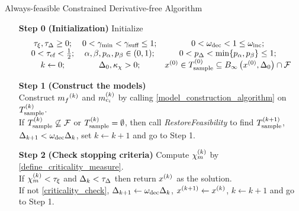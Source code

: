 {
\begin{fullwidth}[leftmargin=0in, rightmargin=0in, width=\linewidth-0.25in]
\begin{flushleft}


\begin{algorithm}[H]
    \caption{Always-feasible Constrained Derivative-free Algorithm}
    \label{constrained_dfo}
    \begin{itemize}
        \item[\textbf{Step 0}] \textbf{(Initialization)} Initialize
\begin{align*}
\begin{array}{ccc}
\tau_{\xi}, \tau_{\Delta} \ge 0; & 
0 < \gamma_{\textrm{min}} < \gamma_{\textrm{suff}} \le 1; & 
0 < \omega_{\text{dec}} < 1 \le \omega_{\text{inc}}; \\
0 < {\tau_{\textrm{ef}}} < \frac 1 2;  & 
\alpha, \beta, p_{\alpha}, p_{\beta} \in (0, 1); & 
0 < p_{\Delta} < \min\{p_{\alpha}, p_{\beta}\} \le 1;  \\
k \gets 0; &
\Delta_0, \kappa_{\chi} > 0; &
{x^{(0)}} \in T^{(0)}_{\textrm{sample}} \subseteq B_{\infty}\left({x^{(0)}}, \Delta_{0}\right) \cap {\mathcal F}
\end{array}
\end{align*}
        \item[\textbf{Step 1}] \textbf{(Construct the models)} \\
        Construct ${{m}_f}^{(k)}$ and ${{m}^{(k)}_{c_i}}$ by calling \cref{model_construction_algorithm} on ${T_{\text{sample}}^{(k)}}$. \\
        If ${T_{\text{sample}}^{(k)}} \not \subseteq {\mathcal F}$ or ${T_{\text{sample}}^{(k)}} = \emptyset$, then call \emph{RestoreFeasibility}  to find ${T_{\text{sample}}^{(k+1)}}$, $\Delta_{k+1}<\omega_{\text{dec}} \Delta_k$, set $k \gets k + 1$ and go to Step 1.
        
        \item[\textbf{Step 2}] \textbf{(Check stopping criteria)}
        	Compute ${\chi_m^{(k)}}$ by \cref{define_criticality_measure}. \\
			If $ {\chi_m^{(k)}} < \tau_{\xi} $ and $\Delta_k <\tau_{\Delta}$ then return $x^{(k)}$ as the solution. \\
			If not \cref{criticality_check},
                $\Delta_{k+1} \gets \omega_{\text{dec}}\Delta_k$, 
                $x^{(k+1)} \gets x^{(k)}$,
                $k \gets k+1$ and go to Step 1.
		

\end{itemize}
\end{algorithm}
\end{flushleft}
\end{fullwidth}}
